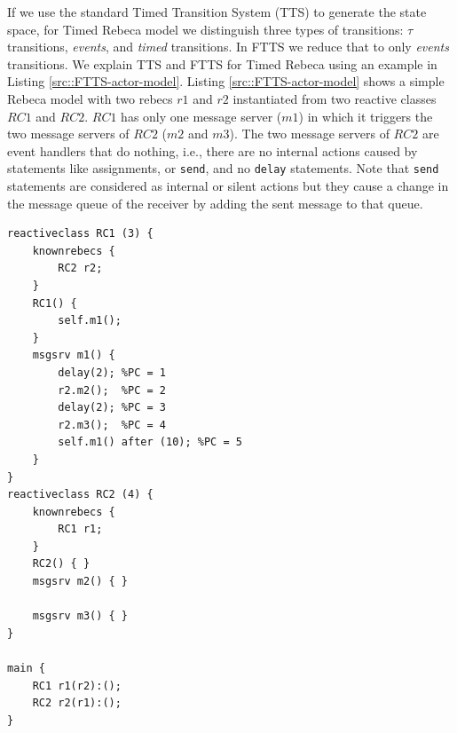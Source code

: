 If we use the standard Timed Transition System (TTS) to generate the state space, for Timed Rebeca model we distinguish three types of transitions: $\tau$ transitions, \textit{events}, and \textit{timed} transitions.
In FTTS we reduce that to only \textit{events} transitions.
%
We explain TTS and FTTS for Timed Rebeca using an example in Listing \ref{src::FTTS-actor-model}.
Listing \ref{src::FTTS-actor-model} shows a simple Rebeca model with two rebecs $r1$ and $r2$ instantiated from two reactive classes $RC1$ and $RC2$.
$RC1$ has only one message server ($m1$) in which it triggers the two message servers of $RC2$ ($m2$ and $m3$).
The two message servers of $RC2$ are event handlers that do nothing, i.e., there are no internal actions caused by statements like assignments, or \texttt{send}, and no  \texttt{delay} statements. Note that \texttt{send} statements are considered as internal or silent actions but they cause a change in the message queue of the receiver by adding the sent message to that queue.
 \vspace{0.5cm}

\begin{lstlisting}[language=rebeca, caption= A simple Timed Rebeca model with two rebecs, label=src::FTTS-actor-model]
reactiveclass RC1 (3) {
	knownrebecs {
		RC2 r2;
	}
	RC1() {
		self.m1();
	}
	msgsrv m1() {
		delay(2); %PC = 1
		r2.m2();  %PC = 2 
		delay(2); %PC = 3 
		r2.m3();  %PC = 4
		self.m1() after (10); %PC = 5
	}
}
reactiveclass RC2 (4) {
	knownrebecs {
		RC1 r1;
	}
	RC2() { }
	msgsrv m2() { }
	
	msgsrv m3() { }
}

main {
	RC1 r1(r2):();
	RC2 r2(r1):();
}

\end{lstlisting}
 
